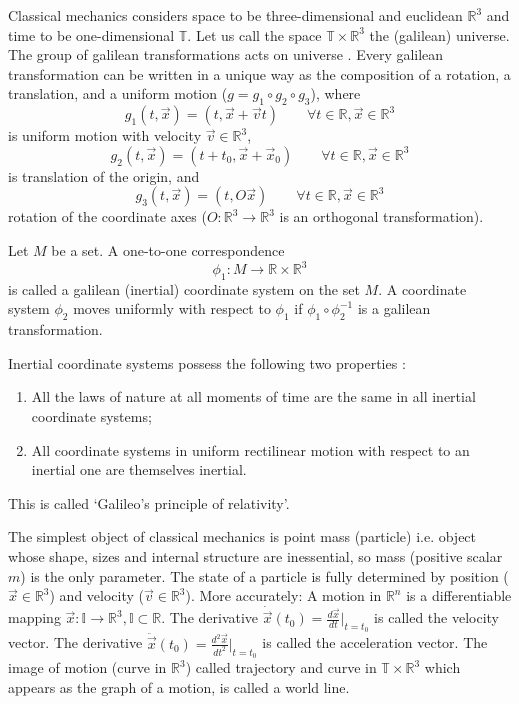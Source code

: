 \documentclass[11pt]{book}
\begin{document}
Classical mechanics considers  space to be three-dimensional  and euclidean $\mathbb{R}^3$ and time 
to be one-dimensional $\mathbb{T}$. Let us call the space $\mathbb{T} \times \mathbb{R}^3$ the (galilean) universe. 
 The  group of galilean transformations acts on universe \cite{arnold-cm}. 
Every galilean transformation can be written in a unique way as the composition of a rotation, a translation,
and a uniform motion ($g = g_1 \circ g_2 \circ g_3$), where
\[g_1(t,\vec x)=(t,\vec x+\vec v t)\qquad \forall t\in \mathbb{R},\vec x \in\mathbb{R}^3\] is uniform motion with velocity $\vec v \in\mathbb{R}^3$,
\[g_2(t,\vec x)=(t+t_0,\vec x+\vec x_0)\qquad \forall t\in \mathbb{R},\vec x \in\mathbb{R}^3\] is translation of the origin, and
\[g_3(t,\vec x)=(t,O\vec x)\qquad \forall t\in \mathbb{R},\vec x \in\mathbb{R}^3\] rotation of the coordinate axes ($O:\mathbb{R}^3 \rightarrow \mathbb{R}^3$ is an orthogonal transformation).

Let $M$ be a set. A one-to-one correspondence 
\[\phi_1: M \rightarrow \mathbb{R} \times \mathbb{R}^3\]
is called a galilean (inertial) coordinate system on the set $M$. A coordinate system $\phi_2$ moves
uniformly with respect to $\phi_1$  if $\phi_1\circ\phi_2^{-1}$ is a galilean
transformation. 

Inertial coordinate systems  possess the following two properties :
\begin{enumerate}
    \item All the laws of nature at all moments of time are the same in all inertial coordinate systems;
    \item  All coordinate systems in uniform rectilinear motion with respect to an inertial one are themselves inertial.
\end{enumerate}
This is called `Galileo's principle of relativity'.

The simplest object of classical mechanics is point mass (particle) i.e. object whose shape, sizes and internal structure are inessential, so mass (positive scalar $m$) is the only parameter. The state of a particle is fully determined by position ($\vec x \in\mathbb{R}^3$) and velocity ($\vec v \in\mathbb{R}^3$). More accurately: A motion in $\mathbb{R}^n$ is a differentiable mapping 
$\vec x: \mathbb{I}\rightarrow \mathbb{R}^3, \mathbb{I} \subset \mathbb{R}$. The derivative $\dot \vec{x}(t_0)=\frac{d\vec x}{dt}|_{t=t_0}$ is called the velocity vector. The derivative $\ddot \vec x(t_0)=\frac{ d^2 \vec x}{dt^2}|_{t=t_0}$ is called the acceleration vector. The image of motion (curve in $\mathbb{R}^3$) called trajectory and  curve in $\mathbb{T} \times \mathbb{R}^3$ which appears  as the graph of a motion, is called a world line.
\end{document}
